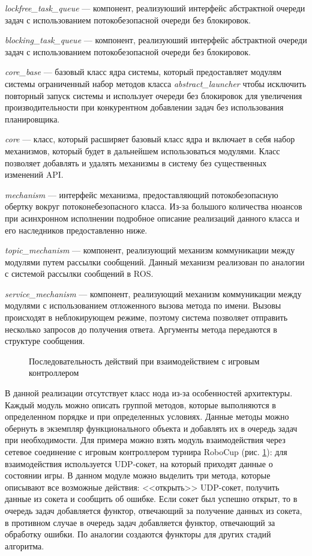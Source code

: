 \textit{lockfree\_task\_queue} --- компонент, реализуюший интерфейс абстрактной очереди задач с использованием потокобезопасной очереди без блокировок.

\textit{blocking\_task\_queue} --- компонент, реализуюший интерфейс абстрактной очереди задач с использованием потокобезопасной очереди без блокировок.

\textit{core\_base} --- базовый класс ядра системы, который предоставляет модулям системы ограниченный набор методов класса \textit{abstract\_launcher} чтобы исключить повторный запуск системы и использует очереди без блокировок для увеличения производительности при конкурентном добавлении задач без использования планировщика.

\textit{core} --- класс, который расширяет базовый класс ядра и включает в себя набор механизмов, который будет в дальнейшем использоваться модулями. Класс позволяет добавлять и удалять механизмы в систему без существенных изменений API.

\textit{mechanism} --- интерфейс механизма, предоставляющий потокобезопасную обертку вокруг потоконебезопасного класса. Из-за большого количества нюансов при асинхронном исполнении подробное описание реализаций данного класса и его наследников предоставленно ниже.

\textit{topic\_mechanism} --- компонент, реализующий механизм коммуникации между модулями путем рассылки сообщений. Данный механизм реализован по аналогии с системой рассылки сообщений в ROS.

\textit{service\_mechanism} --- компонент, реализующий механизм коммуникации между модулями с использованием отложенного вызова метода по имени. Вызовы происходят в неблокирующем режиме, поэтому система позволяет отправить несколько запросов до получения ответа. Аргументы метода передаются в структуре сообщения.

\begin{figure}[h]
    \centering{\texttt{[image: 2\_3\_2\_gc]}}
    \caption{Последовательность действий при взаимодействием с игровым контроллером}
    \label{im:2_3_2_gc}
\end{figure}

В данной реализации отсутствует класс нода из-за особенностей 
архитектуры. Каждый модуль можно описать группой методов, 
которые выполняются в определенном порядке и при определенных 
условиях. Данные методы можно обернуть в экземпляр 
функционального объекта и добавлять их в очередь задач при 
необходимости. Для примера можно взять модуль взаимодействия 
через сетевое соединение с игровым контроллером турнира RoboCup 
(рис. \ref{im:2_3_2_gc}): для взаимодействия используется 
UDP-сокет, на который приходят данные о состоянии игры. В данном 
модуле можно выделить три метода, которые описывают все 
возможные действия: <<открыть>> UDP-сокет, получить данные из 
сокета и сообщить об ошибке. Если сокет был успешно открыт, то в 
очередь задач добавляется функтор, отвечающий за получение 
данных из сокета, в противном случае в очередь задач добавляется 
функтор, отвечающий за обработку ошибки. По аналогии создаются 
функторы для других стадий алгоритма.

